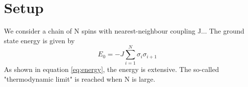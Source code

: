 \documentclass{article}
\begin{document}
\section{Setup}\label{sec:setup}
We consider a chain of N spins with nearest-neighbour coupling J... The ground state energy is given by
\begin{equation}\label{eq:energy}
  E_0 = -J \sum_{i=1}^{N} \sigma_i \sigma_{i+1}
\end{equation}
As shown in equation \ref{eq:energy}, the energy is extensive. The so-called "thermodynamic limit" is reached when N is large.
\end{document}
